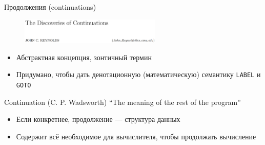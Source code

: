     \begin{frame}[fragile]{Продолжения (continuations)}
        \begin{figure}[t]
            \centering
            \includegraphics[width=0.6\textwidth]{figs/discoveries-of-continuations}
        \end{figure}
        \begin{itemize}
            \item Абстрактная концепция, зонтичный термин
            \item Придумано, чтобы дать денотационную (математическую) семантику \texttt{LABEL} и \texttt{GOTO}
        \end{itemize}
        \pause
        \begin{block}{Continuation (C. P. Wadsworth)}
            \centering
            \large
            \vspace{0.5em}
            ``The meaning of the rest of the program''
            \vspace{0.5em}
        \end{block}
        \begin{itemize}
            \item Если конкретнее, продолжение --- структура данных
            \item Содержит всё необходимое для вычислителя, чтобы продолжать вычисление
        \end{itemize}
    \end{frame}

